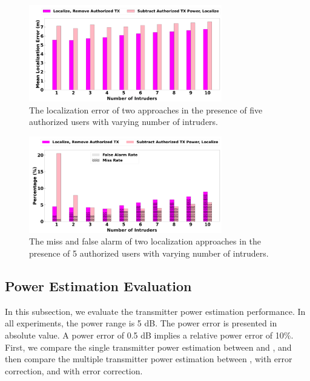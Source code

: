 \begin{figure}[t]
    \centering
    \includegraphics[width=0.75\textwidth]{chapters/wowmom-pmc/figures/splat-error-authorized-varyintru.png}
    \vspace{-0.1in}
    \caption{The localization error of two approaches in the presence of five authorized users with varying number of intruders.}
    \label{fig:authorized_error}
\end{figure}

\begin{figure}[t]
    \centering
    \includegraphics[width=0.75\textwidth]{chapters/wowmom-pmc/figures/splat-missfalse-authorized-varyintru.png}
    \vspace{-0.1in}
    \caption{The miss and false alarm of two localization approaches in the presence of 5 authorized users with varying number of intruders.}
    \label{fig:authorized_missfalse}
\end{figure}




\subsection{\bf Power Estimation Evaluation}
\label{subsec:powereval}
In this subsection, we evaluate the transmitter power estimation performance.
In all experiments, the power range is 5 dB.
The power error is presented in absolute value.
A power error of 0.5 dB implies a relative power error of 10\%.
First, we compare the single transmitter power estimation between \map and \power, and then compare the multiple transmitter power estimation between \map, \power with error correction, and \power with error correction.

